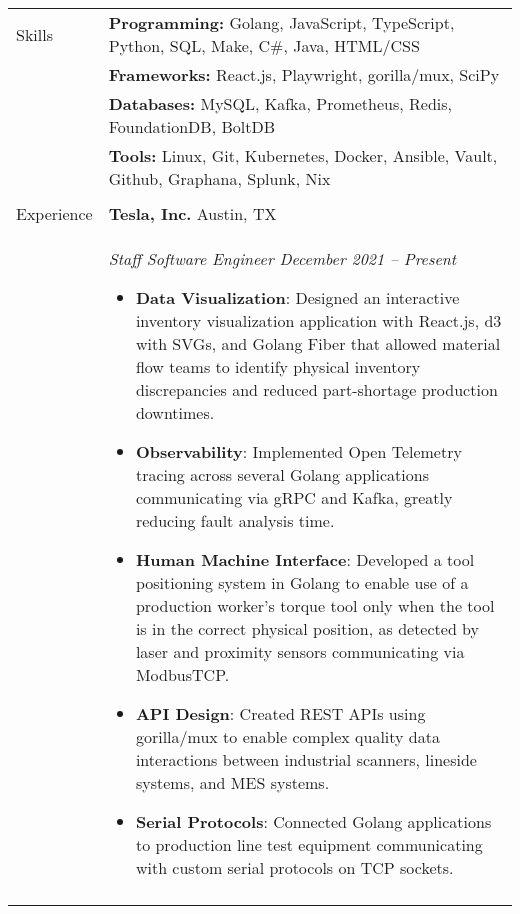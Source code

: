 \documentclass[11pt]{article}
\begin{document}
\noindent
\begin{tabular}[t]{@{}p{1.05in} @{}p{6.00in}}

{Skills}
&
\textbf{Programming:} Golang, JavaScript, TypeScript, Python, SQL, Make, C\#, Java, HTML/CSS%
\\
&
\textbf{Frameworks:} React.js, Playwright, gorilla/mux, SciPy%
\\
&
\textbf{Databases:} MySQL, Kafka, Prometheus, Redis, FoundationDB, BoltDB%
\\
&
\textbf{Tools:} Linux, Git, Kubernetes, Docker, Ansible, Vault, Github, Graphana, Splunk, Nix%
\\
\\

{Experience}
&
\textbf{Tesla, Inc.}  \hfill Austin, TX \\ &
 
    \textit{Staff Software Engineer \hfill December 2021 -- Present}
        \begin{itemize}[noitemsep,topsep=0pt]
            \item \textbf{Data Visualization}: Designed an interactive inventory visualization application with React.js, d3 with SVGs, and Golang Fiber that allowed material flow teams to identify physical inventory discrepancies and reduced part-shortage production downtimes.%
            \item \textbf{Observability}: Implemented Open Telemetry tracing across several Golang applications communicating via gRPC and Kafka, greatly reducing fault analysis time.%
            \item \textbf{Human Machine Interface}: Developed a tool positioning system in Golang to enable use of a production worker's torque tool only when the tool is in the correct physical position, as detected by laser and proximity sensors communicating via ModbusTCP.%
            \item \textbf{API Design}: Created REST APIs using gorilla/mux to enable complex quality data interactions between industrial scanners, lineside systems, and MES systems.%
            \item \textbf{Serial Protocols}: Connected Golang applications to production line test equipment communicating with custom serial protocols on TCP sockets.%
        \end{itemize}
\\ &
 

\end{tabular}
\end{document}
